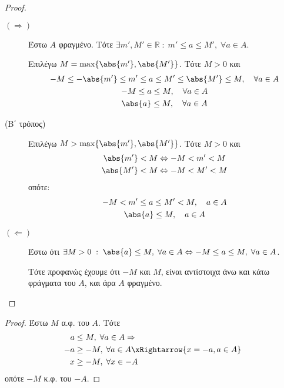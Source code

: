 \documentclass[main.tex]{subfiles}
\begin{document}
\begin{proof}
\item {}
  \begin{description}
    \item [$ (\Rightarrow) $] Έστω $A$ φραγμένο. Τότε 
      $ \exists m',M' \in \mathbb{R} \; : \; m' \leq a \leq M', \; 
      \forall a \in A $.

      Επιλέγω $ M = \max \{ \abs{m'}, \abs{M'} \} $. Τότε $ M >0 $ και 
      \begin{gather*}
        -M \leq - \abs{m'} \leq m' \leq a \leq M' \leq \abs{M'} 
        \leq M, \quad \forall a \in A \\
        -M \leq a \leq M, \quad \forall a \in A \\
        \abs{a} \leq M, \quad \forall a \in A
      \end{gather*}

    \item [(Β΄ τρόπος)]
      Επιλέγω $ M > \max \{ \abs{m'}, \abs{M'} \} $. Τότε $ M >0 $ και 
      \begin{gather*}
        \abs{m'} < M \Leftrightarrow - M < m' < M \\
        \abs{M'} < M \Leftrightarrow -M < M' < M 
      \end{gather*}
      οπότε: 
      \begin{gather*}
        -M < m' \leq a \leq M' < M, \quad a \in A \\
        \abs{a} \leq M, \quad a \in A
      \end{gather*}


    \item [$ (\Leftarrow) $]
      Έστω ότι $ \exists M>0 \; : \; \abs{a} \leq M, \; \forall a \in 
      A \Leftrightarrow -M \leq a \leq M, \; \forall a \in A$. 

      Τότε προφανώς έχουμε ότι $-M $ και $ M $, 
      είναι αντίστοιχα άνω και κάτω φράγματα του $A$, και άρα $A$ 
      φραγμένο.
  \end{description} 
\end{proof}


\begin{proof}
  Έστω $M$ α.φ. του $A$. Τότε 
  \begin{align*}
    a &\leq M, \; \forall a \in A \Rightarrow  \\
    -a &\geq -M, \; \forall a \in A \xRightarrow{x= -a, a \in A} \\
    x &\geq -M, \; \forall x \in -A
  \end{align*}
  οπότε $ -M $  κ.φ. του $ -A $.
\end{proof}
\end{document}
